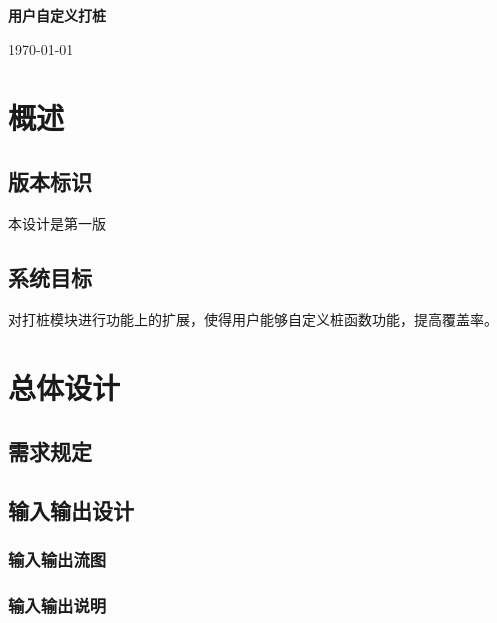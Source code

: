 \documentclass{article}
\begin{document}
	\begin{Huge} \centerline{ \textbf{用户自定义打桩} } \end{Huge}
	
	\begin{large}
		\centerline{\today}
	\end{large}
	\section{概述}
		\subsection{版本标识}
			本设计是第一版
			
		\subsection{系统目标}
			对打桩模块进行功能上的扩展，使得用户能够自定义桩函数功能，提高覆盖率。
	\section{总体设计}
		\subsection{需求规定}
			

			
		\subsection{输入输出设计}
			\subsubsection{输入输出流图}
			
			\subsubsection{输入输出说明}
			
\end{document}
